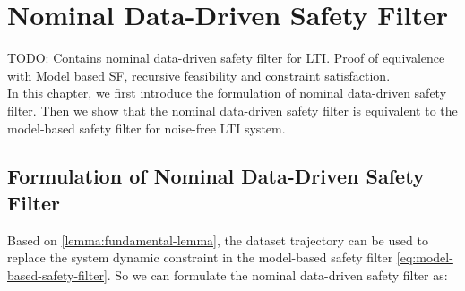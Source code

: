 \chapter{Nominal Data-Driven Safety Filter}\label{chap:nominal-ddsf}
TODO:  Contains nominal data-driven safety filter for LTI. Proof of equivalence with Model based SF, recursive feasibility and constraint satisfaction.\\


In this chapter, we first introduce the formulation of nominal data-driven safety filter.
Then we show that the nominal data-driven safety filter is equivalent to the model-based safety filter for noise-free LTI system.

\section{Formulation of Nominal Data-Driven Safety Filter}
Based on \cref{lemma:fundamental-lemma}, the dataset trajectory can be used to replace the system dynamic constraint in the model-based safety filter \cref{eq:model-based-safety-filter}.
So we can formulate the nominal data-driven safety filter as:
